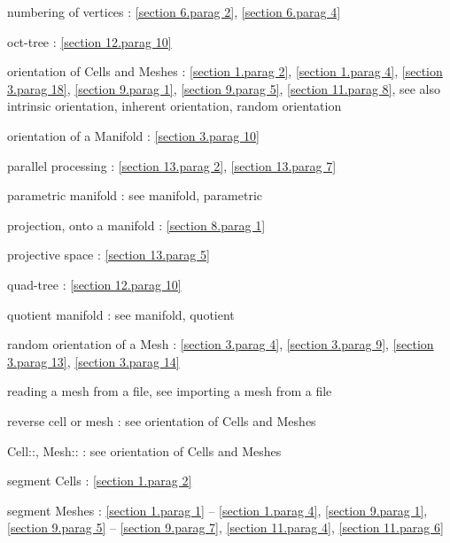 \documentclass[a4paper,oneside]{scrbook}
\def\numb{}
\newcommand\verm[1]{\textcolor{manif}{#1}}
\renewcommand\tt{\normalfont\ttfamily}
\begin{document}
\noindent
numbering of vertices :
\ref{\numb section 6.\numb parag 2}, \ref{\numb section 6.\numb parag 4}

\noindent
oct-tree : \ref{\numb section 12.\numb parag 10}

\noindent
orientation of {\small\tt \verm{Cell}}s and {\small\tt \verm{Mesh}}es :
\ref{\numb section 1.\numb parag 2}, \ref{\numb section 1.\numb parag 4},
\ref{\numb section 3.\numb parag 18}, \ref{\numb section 9.\numb parag 1},
\ref{\numb section 9.\numb parag 5}, \ref{\numb section 11.\numb parag 8},\hfil\break
\hglue 9mm see also intrinsic orientation, inherent orientation, random orientation

\noindent
orientation of a {\small\tt \verm{Manifold}} : \ref{\numb section 3.\numb parag 10}

\noindent
parallel processing : \ref{\numb section 13.\numb parag 2}, \ref{\numb section 13.\numb parag 7}

\noindent
parametric manifold : see manifold, parametric

\noindent
projection, onto a manifold :
\ref{\numb section 8.\numb parag 1}

\noindent
projective space : \ref{\numb section 13.\numb parag 5}

\noindent
quad-tree : \ref{\numb section 12.\numb parag 10}

\noindent
quotient manifold : see manifold, quotient

\noindent
random orientation of a {\small\tt\verm{Mesh}} : \ref{\numb section 3.\numb parag 4},
\ref{\numb section 3.\numb parag 9}, \ref{\numb section 3.\numb parag 13},
\ref{\numb section 3.\numb parag 14}

\noindent
reading a mesh from a file, see importing a mesh from a file

\noindent
reverse cell or mesh : see orientation of {\small\tt \verm{Cell}}s and {\small\tt \verm{Mesh}}es

\noindent
{\small\tt\verm{Cell}::}, {\small\tt\verm{Mesh}::} :
see orientation of {\small\tt \verm{Cell}}s and {\small\tt \verm{Mesh}}es

\noindent
segment {\small\tt \verm{Cell}}s : \ref{\numb section 1.\numb parag 2}

\noindent
segment {\small\tt \verm{Mesh}}es :
\ref{\numb section 1.\numb parag 1} -- \ref{\numb section 1.\numb parag 4},
\ref{\numb section 9.\numb parag 1}, \ref{\numb section 9.\numb parag 5} --
\ref{\numb section 9.\numb parag 7}, \ref{\numb section 11.\numb parag 4},
\ref{\numb section 11.\numb parag 6}
\end{document}
